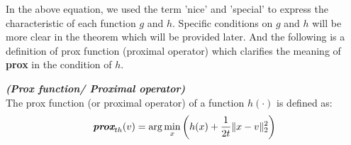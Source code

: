 \documentclass[12pt]{report}
\begin{document}
In the above equation, we used the term 'nice' and 'special' to express the characteristic of each function $g$ and $h$. Specific conditions on $g$ and $h$ will be more clear in the theorem which will be provided later. And the following is a definition of prox function (proximal operator) which clarifies the meaning of \textbf{prox} in the condition of $h$.

\begin{definition}\textbf{\em{(Prox function/ Proximal operator)}}\\
The prox function (or proximal operator) of a function $h(\cdot)$ is defined as:
\begin{equation}
\textbf{\em{prox}}_{th}(v) = \arg\min_{x} \left( h(x)+\frac{1}{2t}\|x-v\|_2^2 \right)
\end{equation}
\end{definition}
\end{document}
